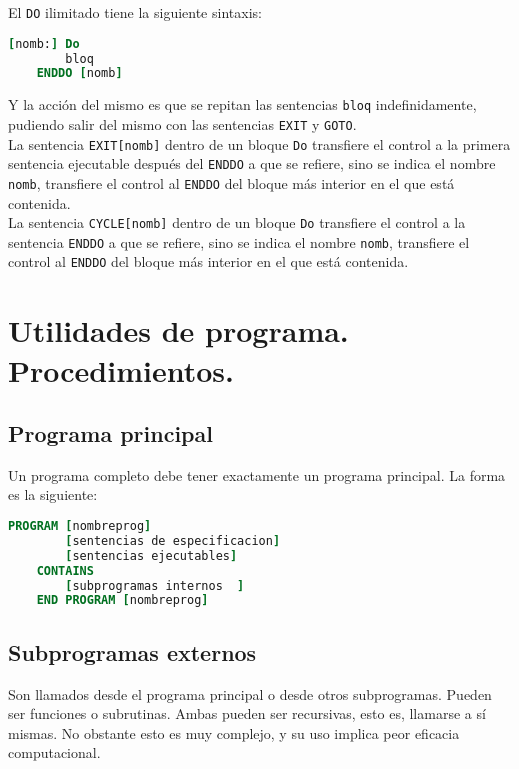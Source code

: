 El {\tt DO} ilimitado tiene la siguiente sintaxis:

\begin{lstlisting}[language=Fortran]
	[nomb:] Do 
		bloq
	ENDDO [nomb]
\end{lstlisting}
Y la acción del mismo es que se repitan las sentencias {\tt bloq} indefinidamente, pudiendo salir del mismo con las sentencias {\tt EXIT} y {\tt GOTO}. \\


La sentencia {\tt EXIT[nomb]} dentro de un bloque {\tt Do} transfiere el control a la primera sentencia ejecutable después del {\tt ENDDO} a que se refiere, sino se indica el nombre {\tt nomb}, transfiere el control al {\tt ENDDO} del bloque más interior en el que está contenida. \\ 


La sentencia {\tt CYCLE[nomb]} dentro de un bloque {\tt Do} transfiere el control a la sentencia {\tt ENDDO} a que se refiere, sino se indica el nombre {\tt nomb}, transfiere el control al {\tt ENDDO} del bloque más interior en el que está contenida. 


\section{Utilidades de programa. Procedimientos.}

\subsection{Programa principal}

Un programa completo debe tener exactamente un programa principal. La forma es la siguiente:

\begin{lstlisting}[language=Fortran]
	PROGRAM [nombreprog]
		[sentencias de especificacion]
		[sentencias ejecutables]
	CONTAINS
		[subprogramas internos	]
	END PROGRAM [nombreprog]	
\end{lstlisting}

\subsection{Subprogramas externos}

Son llamados desde el programa principal o desde otros subprogramas. Pueden ser funciones o subrutinas. Ambas pueden ser recursivas, esto es, llamarse a sí mismas. No obstante esto es muy complejo, y su uso implica peor eficacia computacional. 

